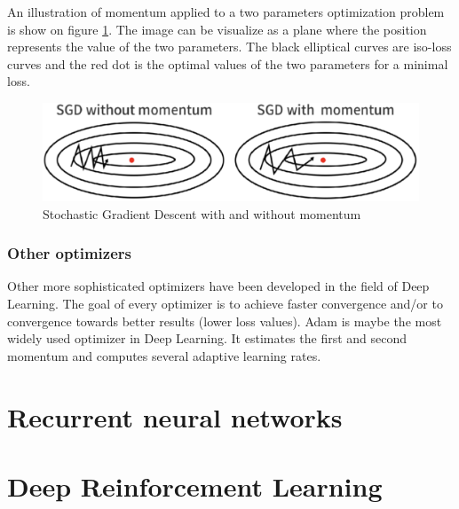 An illustration of momentum applied to a two parameters optimization problem is show on figure \ref{fig:momentum}. The image can be visualize as a plane where the position represents the value of the two parameters. The black elliptical curves are iso-loss curves and the red dot is the optimal values of the two parameters for a minimal loss.\\

\begin{figure}[h!]
    \centering
    \includegraphics[width=.7\textwidth]{images/momentum.png}
    \caption{Stochastic Gradient Descent with and without momentum \cite{momentum}}
    \label{fig:momentum}
\end{figure}

\subsubsection{Other optimizers}

Other more sophisticated optimizers have been developed in the field of Deep Learning. The goal of every optimizer is to achieve faster convergence and/or to convergence towards better results (lower loss values). Adam \cite{adam} is maybe the most widely used optimizer in Deep Learning. It estimates the first and second momentum and computes several adaptive learning rates. 

\section{Recurrent neural networks}

\section{Deep Reinforcement Learning} \label{sec:DRL}


